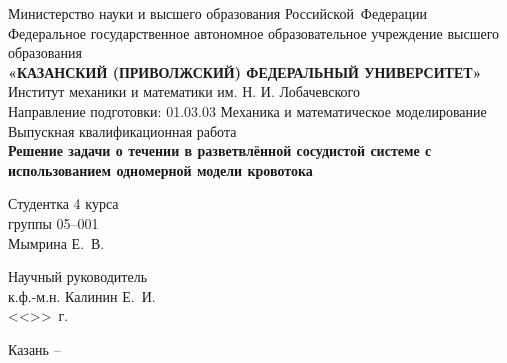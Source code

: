 \begin{titlepage}
\begin{center}

\hfill \break

\large{Министерство науки и высшего образования Российской~Федерации}\\
\footnotesize{Федеральное государственное автономное образовательное учреждение высшего образования}\\ 
\small{\textbf{«КАЗАНСКИЙ (ПРИВОЛЖСКИЙ) ФЕДЕРАЛЬНЫЙ УНИВЕРСИТЕТ»}}\\

\hfill \break
\normalsize{Институт механики и математики им. Н. И. Лобачевского}\\

\hfill \break
\normalsize{Направление подготовки: 01.03.03 Механика и математическое моделирование}\\

\vspace{25mm}
\large{Выпускная квалификационная работа}\\
\large{\textbf{Решение задачи о течении в разветвлённой сосудистой системе с использованием одномерной модели кровотока}}\\
\end{center}

\vspace{20mm}
\noindent
Студентка 4 курса \\
группы 05--001 \\
Мымрина Е.~В.

\hfill \break
Научный руководитель \\
к.ф.-м.н. Калинин Е.~И. \\
<<\underline{\hspace{0,75cm}}>>\underline{\hspace{2cm}}\the\year~г.

\vspace{\fill}

\begin{center}
    Казань -- \the\year
\end{center}
\thispagestyle{empty}

\end{titlepage}
